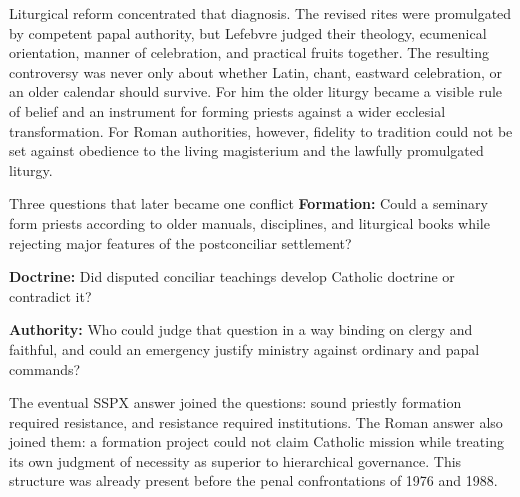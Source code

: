 Liturgical reform concentrated that diagnosis. The revised rites were promulgated by competent papal authority, but Lefebvre judged their theology, ecumenical orientation, manner of celebration, and practical fruits together. The resulting controversy was never only about whether Latin, chant, eastward celebration, or an older calendar should survive. For him the older liturgy became a visible rule of belief and an instrument for forming priests against a wider ecclesial transformation. For Roman authorities, however, fidelity to tradition could not be set against obedience to the living magisterium and the lawfully promulgated liturgy.

\begin{studybox}{Three questions that later became one conflict}
\textbf{Formation:} Could a seminary form priests according to older manuals, disciplines, and liturgical books while rejecting major features of the postconciliar settlement?\par
\textbf{Doctrine:} Did disputed conciliar teachings develop Catholic doctrine or contradict it?\par
\textbf{Authority:} Who could judge that question in a way binding on clergy and faithful, and could an emergency justify ministry against ordinary and papal commands?
\end{studybox}

The eventual SSPX answer joined the questions: sound priestly formation required resistance, and resistance required institutions. The Roman answer also joined them: a formation project could not claim Catholic mission while treating its own judgment of necessity as superior to hierarchical governance. This structure was already present before the penal confrontations of 1976 and 1988.
